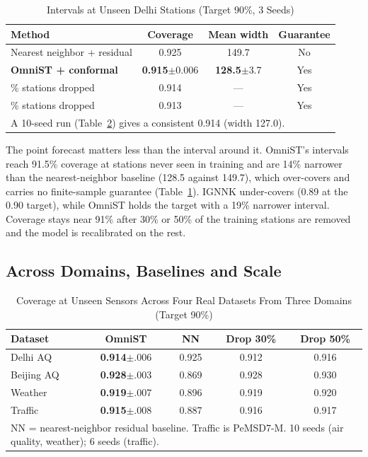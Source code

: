 \documentclass[journal]{IEEEtran}
\begin{document}
\begin{table}[htbp]
\caption{Intervals at Unseen Delhi Stations (Target 90\%, 3 Seeds)}
\centering
\footnotesize
\setlength{\tabcolsep}{4pt}
\begin{tabular}{lccc}
\toprule
\textbf{Method} & \textbf{Coverage} & \textbf{Mean width} & \textbf{Guarantee} \\
\midrule
Nearest neighbor + residual & 0.925 & 149.7 & No \\
\textbf{OmniST + conformal} & \textbf{0.915}$\pm$0.006 & \textbf{128.5}$\pm$3.7 & Yes \\
\quad 30\% stations dropped & 0.914 & --- & Yes \\
\quad 50\% stations dropped & 0.913 & --- & Yes \\
\bottomrule
\multicolumn{4}{p{0.9\columnwidth}}{\footnotesize A 10-seed run (Table~\ref{tab:multidomain}) gives a
consistent 0.914 (width 127.0).} \\
\end{tabular}
\label{tab:conformal}
\end{table}

The point forecast matters less than the interval around it. OmniST's intervals reach 91.5\%
coverage at stations never seen in training and are 14\% narrower than the nearest-neighbor baseline
(128.5 against 149.7), which over-covers and carries no finite-sample guarantee
(Table~\ref{tab:conformal}). IGNNK under-covers (0.89 at the 0.90 target), while OmniST holds the
target with a 19\% narrower interval. Coverage stays near 91\% after 30\% or 50\% of the training
stations are removed and the model is recalibrated on the rest.

\subsection{Across Domains, Baselines and Scale}
\label{sec:robustness}

\begin{table}[htbp]
\caption{Coverage at Unseen Sensors Across Four Real Datasets From Three Domains (Target 90\%)}
\centering
\footnotesize
\setlength{\tabcolsep}{4pt}
\begin{tabular}{lcccc}
\toprule
\textbf{Dataset} & \textbf{OmniST} & \textbf{NN} & \textbf{Drop 30\%} & \textbf{Drop 50\%} \\
\midrule
Delhi AQ   & \textbf{0.914}$\pm$.006 & 0.925 & 0.912 & 0.916 \\
Beijing AQ & \textbf{0.928}$\pm$.003 & 0.869 & 0.928 & 0.930 \\
Weather    & \textbf{0.919}$\pm$.007 & 0.896 & 0.919 & 0.920 \\
Traffic    & \textbf{0.915}$\pm$.008 & 0.887 & 0.916 & 0.917 \\
\bottomrule
\multicolumn{5}{p{0.95\columnwidth}}{\footnotesize NN = nearest-neighbor residual baseline. Traffic
is PeMSD7-M. 10 seeds (air quality, weather); 6 seeds (traffic).} \\
\end{tabular}
\label{tab:multidomain}
\end{table}
\end{document}

